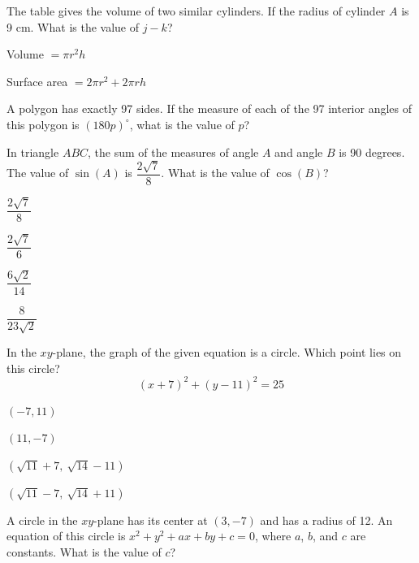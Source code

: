 \vfill
\noindent\begin{minipage}{\linewidth}
\par\smallskip
The table gives the volume of two similar cylinders. If the radius of cylinder $A$ is 9 cm. What is the value of $j-k$?\par\smallskip Volume $=\pi r^2h$\par Surface area $=2\pi r^2+2\pi rh$
\satfig{\figtblcyljk}
\end{minipage}
\vfill
\noindent\begin{minipage}{\linewidth}
\par\smallskip
A polygon has exactly 97 sides. If the measure of each of the 97 interior angles of this polygon is $(180p)^\circ$, what is the value of $p$?
\end{minipage}
\vfill
\clearpage
\noindent\begin{minipage}{\linewidth}
\par\smallskip
In triangle $ABC$, the sum of the measures of angle $A$ and angle $B$ is 90 degrees. The value of $\sin(A)$ is $\dfrac{2\sqrt{7}}{8}$. What is the value of $\cos(B)$?
\begin{satchoices}
  \item[A)] $\dfrac{2\sqrt{7}}{8}$
  \item[B)] $\dfrac{2\sqrt{7}}{6}$
  \item[C)] $\dfrac{6\sqrt{2}}{14}$
  \item[D)] $\dfrac{8}{23\sqrt{2}}$
\end{satchoices}
\end{minipage}
\vfill
\noindent\begin{minipage}{\linewidth}
\par\smallskip
In the $xy$-plane, the graph of the given equation is a circle. Which point lies on this circle? $$(x+7)^2+(y-11)^2=25$$
\begin{satchoices}
  \item[A)] $(-7,11)$
  \item[B)] $(11,-7)$
  \item[C)] $\left(\sqrt{11}+7,\ \sqrt{14}-11\right)$
  \item[D)] $\left(\sqrt{11}-7,\ \sqrt{14}+11\right)$
\end{satchoices}
\end{minipage}
\vfill
\noindent\begin{minipage}{\linewidth}
\par\smallskip
A circle in the $xy$-plane has its center at $(3,-7)$ and has a radius of 12. An equation of this circle is $x^2+y^2+ax+by+c=0$, where $a$, $b$, and $c$ are constants. What is the value of $c$?
\end{minipage}
